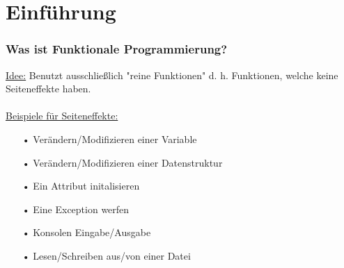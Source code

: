 	\section[Section]{Einführung}
		\begin{frame}
			\frametitle{Was ist Funktionale Programmierung?}
				\underline{Idee:}
				Benutzt ausschließlich "reine Funktionen" d. h. Funktionen, welche 					keine Seiteneffekte haben. \\
				\leavevmode \\
				\underline{Beispiele für Seiteneffekte:}
				\begin{itemize}
				\item[•] Verändern/Modifizieren einer Variable
				\item[•] Verändern/Modifizieren einer Datenstruktur
				\item[•] Ein Attribut initalisieren
				\item[•] Eine Exception werfen
				\item[•] Konsolen Eingabe/Ausgabe
				\item[•] Lesen/Schreiben aus/von einer Datei
				\end{itemize}
		\end{frame}